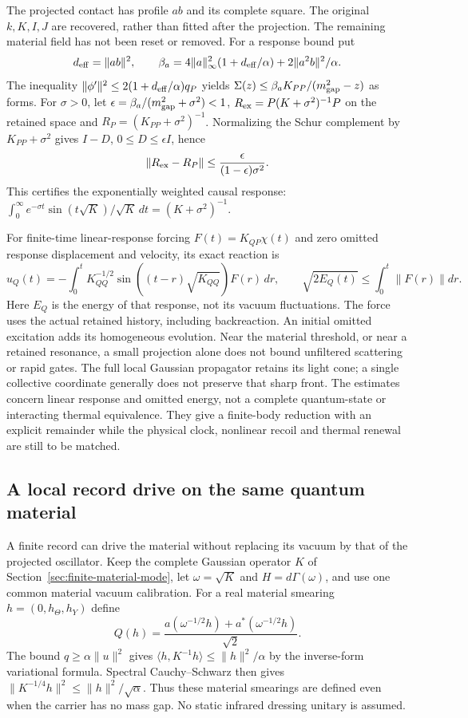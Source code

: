The projected contact has profile $ab$ and its complete square.
The original $k,K,I,J$ are recovered, rather than fitted after the
projection. The remaining material field has not been reset or removed.
For a response bound put
\[
 d_{\rm eff}=\|ab\|^2,\qquad
 \beta_a=4\|a\|_\infty^2(1+d_{\rm eff}/\alpha)
                       +2\|a^2b\|^2/\alpha.
\]
The inequality
$\|\phi'\|^2\le2(1+d_{\rm eff}/\alpha)q_P$ yields
$\Sigma(z)\le\beta_a K_{PP}/(m_{\rm gap}^2-z)$ as forms.
For $\sigma>0$, let
$\epsilon=\beta_a/(m_{\rm gap}^2+\sigma^2)<1$,
$R_{\rm ex}=P(K+\sigma^2)^{-1}P$ on the retained space and
$R_P=(K_{PP}+\sigma^2)^{-1}$. Normalizing the Schur complement by
$K_{PP}+\sigma^2$ gives $I-D$, $0\le D\le\epsilon I$, hence
\[
 \|R_{\rm ex}-R_P\|
             \le\frac{\epsilon}{(1-\epsilon)\sigma^2}.
\]
This certifies the exponentially weighted causal response:
$\int_0^\infty e^{-\sigma t}\sin(t\sqrt K)/\sqrt K\,dt
=(K+\sigma^2)^{-1}$.

For finite-time linear-response forcing $F(t)=K_{QP}\chi(t)$ and zero
omitted response displacement and velocity, its exact reaction is
\[
 u_Q(t)=-\int_0^t K_{QQ}^{-1/2}
       \sin((t-r)\sqrt{K_{QQ}})F(r)\,dr,
 \qquad \sqrt{2E_Q(t)}\le\int_0^t\|F(r)\|dr.
\]
Here $E_Q$ is the energy of that response, not its vacuum fluctuations.
The force uses the actual retained history, including backreaction.
An initial omitted excitation adds its homogeneous evolution.
Near the material threshold, or near a retained resonance, a small
projection alone does not bound unfiltered scattering or rapid gates.
The full local Gaussian propagator retains its light cone; a single
collective coordinate generally does not preserve that sharp front.
The estimates concern linear response and omitted energy, not a
complete quantum-state or interacting thermal equivalence. They give
a finite-body reduction with an explicit remainder while the physical
clock, nonlinear recoil and thermal renewal are still to be matched.

\subsection{A local record drive on the same quantum material}
\label{sec:local-material-actuation}

A finite record can drive the material without replacing its vacuum by
that of the projected oscillator. Keep the complete Gaussian operator
$K$ of Section~\ref{sec:finite-material-mode}, let $\omega=\sqrt K$
and $H=d\Gamma(\omega)$, and use one common material vacuum calibration.
For a real material smearing $h=(0,h_\Theta,h_Y)$ define
\[
 Q(h)=\frac{a(\omega^{-1/2}h)+a^*(\omega^{-1/2}h)}{\sqrt2}.
\]
The bound $q\ge\alpha\|u\|^2$ gives
$\langle h,K^{-1}h\rangle\le\|h\|^2/\alpha$ by the inverse-form
variational formula. Spectral Cauchy--Schwarz then gives
$\|K^{-1/4}h\|^2\le\|h\|^2/\sqrt\alpha$.
Thus these material smearings are defined even when the carrier has no
mass gap. No static infrared dressing unitary is assumed.

